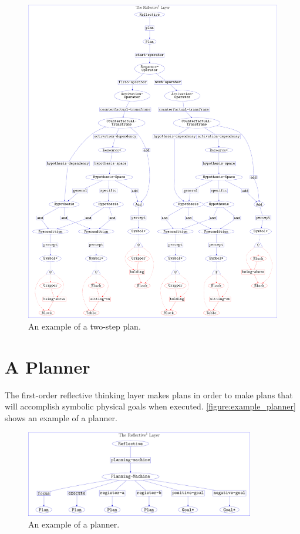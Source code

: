 \begin{figure}
\hspace*{-4cm}\includegraphics[width=18cm]{gfx/example_plan}
\caption[An example of a two-step plan.]{An example of a two-step
  plan.}
\label{figure:example_plan}
\end{figure}

\section{A Planner}

The first-order reflective thinking layer makes plans in order to make
plans that will accomplish symbolic physical goals when executed.
{\mbox{\autoref{figure:example_planner}}} shows an example of a
planner.
\begin{figure}
\includegraphics[width=10cm]{gfx/example_planner}
\caption[An example of a planner.]{An example of a planner.}
\label{figure:example_planner}
\end{figure}


